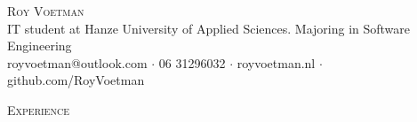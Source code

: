 \documentclass[a4paper]{article}
\newcommand{\lineunder} {
    \vspace*{-8pt} \\
    \hspace*{-18pt} \hrulefill \\
}
\newcommand{\header} [1] {
    {\hspace*{-18pt}\vspace*{6pt} \textsc{#1}}
    \vspace*{-6pt} \lineunder
}
\begin{document}
\vspace*{-40pt}

    

\vspace*{-10pt}
\begin{center}
	{\Huge \scshape {Roy Voetman}}\\
    \vspace*{3pt}
    {IT student at Hanze University of Applied Sciences. Majoring in Software Engineering}\\
    \vspace*{3pt}
	royvoetman@outlook.com $\cdot$ 06 31296032 $\cdot$ royvoetman.nl $\cdot$ github.com/RoyVoetman\\
\end{center}

\header{Experience}
\vspace{1mm}
\end{document}
